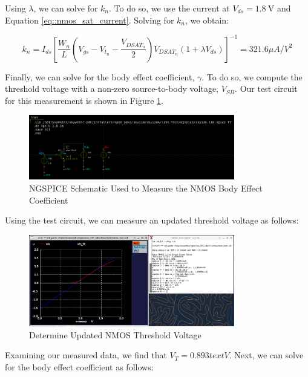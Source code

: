 \documentclass{article}
\begin{document}
	\noindent Using $\lambda$, we can solve for $k_n$. To do so, we use the current at $V_{ds}=1.8\ \text{V}$ and Equation \ref{eq::nmos_sat_current}. Solving for $k_n$, we obtain:
	
	\begin{equation}
		k_n = I_{ds}\left[\frac{W_n}{L}\left(V_{gs} - V_{t_n} - \frac{V_{DSAT_n}}{2}\right)V_{DSAT_n}(1 + {\lambda}V_{ds})\right]^{-1} = 321.6 {\mu}A/V^2
	\end{equation}
	
	Finally, we can solve for the body effect coefficient, $\gamma$. To do so, we compute the threshold voltage with a non-zero source-to-body voltage, $V_{SB}$. Our test circuit for this measurement is shown in Figure \ref{fig::nmos_gamma_meas_schem}.
	
	 \begin{figure}[H]
		\centerline{\includegraphics[width=0.8\textwidth]{nmos_gamma_meas_schem.png}}
		\caption{NGSPICE Schematic Used to Measure the NMOS Body Effect Coefficient}
		\label{fig::nmos_gamma_meas_schem}
	\end{figure}
	
	\noindent Using the test circuit, we can measure an updated threshold voltage as follows:
	
	\begin{figure}[H]
		\centerline{\includegraphics[width=0.8\textwidth]{nmos_gamma_meas.png}}
		\caption{Determine Updated NMOS Threshold Voltage}
		\label{fig::nmos_gamma_meas}
	\end{figure}
	
	\noindent Examining our measured data, we find that $V_T = 0.893 text{V}$. Next, we can solve for the body effect coefficient as follows:
	
\end{document}
